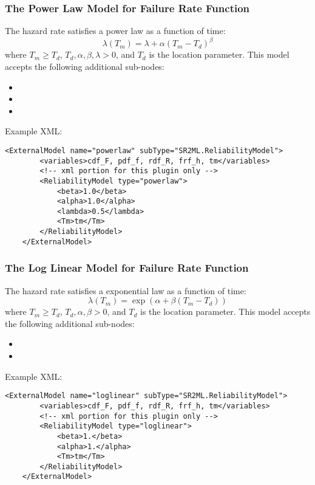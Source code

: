 \subsubsection{The Power Law Model for Failure Rate Function}
The hazard rate satisfies a power law as a function of time:
\begin{equation}
	\lambda(T_m) = \lambda + \alpha(T_m-T_d)^\beta
\end{equation}
where $T_m\geq T_d$, $T_d, \alpha, \beta, \lambda >0$,
and $T_d$ is the location parameter.
This model accepts the following additional sub-nodes:
\begin{itemize}
	\item {}
	\item {}
	\item {}
\end{itemize}

Example XML:
\begin{lstlisting}[style=XML]
	<ExternalModel name="powerlaw" subType="SR2ML.ReliabilityModel">
		<variables>cdf_F, pdf_f, rdf_R, frf_h, tm</variables>
		<!-- xml portion for this plugin only -->
		<ReliabilityModel type="powerlaw">
			<beta>1.0</beta>
			<alpha>1.0</alpha>
			<lambda>0.5</lambda>
			<Tm>tm</Tm>
		</ReliabilityModel>
	</ExternalModel>
\end{lstlisting}


\subsubsection{The Log Linear Model for Failure Rate Function}
The hazard rate satisfies a exponential law as a function of time:
\begin{equation}
	\lambda(T_m) = \exp\left(\alpha+\beta(T_m-T_d)\right)
\end{equation}
where $T_m\geq T_d$, $T_d, \alpha, \beta >0$, and $T_d$ is the location parameter.
This model accepts the following additional sub-nodes:
\begin{itemize}
	\item {}
	\item {}
\end{itemize}

Example XML:
\begin{lstlisting}[style=XML]
	<ExternalModel name="loglinear" subType="SR2ML.ReliabilityModel">
		<variables>cdf_F, pdf_f, rdf_R, frf_h, tm</variables>
		<!-- xml portion for this plugin only -->
		<ReliabilityModel type="loglinear">
			<beta>1.</beta>
			<alpha>1.</alpha>
			<Tm>tm</Tm>
		</ReliabilityModel>
	</ExternalModel>
\end{lstlisting}


